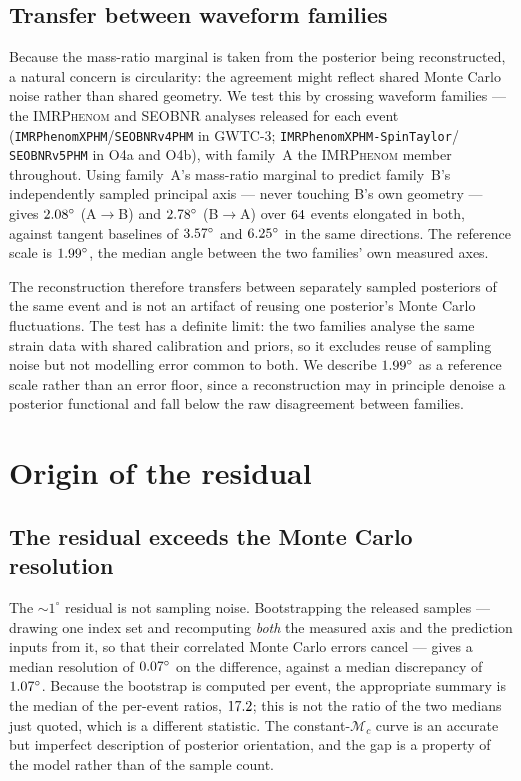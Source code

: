 \documentclass[aps,prd,twocolumn,amsmath,amssymb,nofootinbib,superscriptaddress]{revtex4-2}
\begin{document}
\subsection{Transfer between waveform families}
\label{sec:xfam}
Because the mass-ratio marginal is taken from the posterior being reconstructed, a natural concern is
circularity: the agreement might reflect shared Monte Carlo noise rather than shared geometry. We test this
by crossing waveform families --- the \textsc{IMRPhenom} and \textsc{SEOBNR} analyses released for each
event (\texttt{IMRPhenomXPHM}/\texttt{SEOBNRv4PHM} in GWTC-3; \texttt{IMRPhenomXPHM-SpinTaylor}/%
\texttt{SEOBNRv5PHM} in O4a and O4b), with family~A the \textsc{IMRPhenom} member throughout. Using
family~A's mass-ratio marginal to predict family~B's independently
sampled principal axis --- never touching B's own geometry --- gives $2.08^\circ$ (A$\to$B) and
$2.78^\circ$ (B$\to$A) over $64$ events elongated in both, against tangent baselines of
$3.57^\circ$ and $6.25^\circ$ in the same directions. The reference scale is
$1.99^\circ$, the median angle between the two families' own measured axes.

The reconstruction therefore transfers between separately sampled posteriors of the same event and is not
an artifact of reusing one posterior's Monte Carlo fluctuations. The test has a definite limit: the two
families analyse the same strain data with shared calibration and priors, so it excludes reuse of sampling
noise but not modelling error common to both. We describe $1.99^\circ$ as a reference scale rather
than an error floor, since a reconstruction may in principle denoise a posterior functional and fall below
the raw disagreement between families.

\section{Origin of the residual}
\label{sec:residual}

\subsection{The residual exceeds the Monte Carlo resolution}
\label{sec:mcres}
The $\sim\!1^\circ$ residual is not sampling noise. Bootstrapping the released samples --- drawing one
index set and recomputing \emph{both} the measured axis and the prediction inputs from it, so that their
correlated Monte Carlo errors cancel --- gives a median resolution of $0.07^\circ$ on the
difference, against a median discrepancy of $1.07^\circ$. Because the bootstrap is computed per
event, the appropriate summary is the median of the per-event ratios, $17.2$; this is not the
ratio of the two medians just quoted, which is a different statistic. The
constant-$\mathcal{M}_c$ curve is an accurate but imperfect description of posterior orientation, and the
gap is a property of the model rather than of the sample count.
\end{document}
